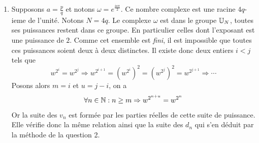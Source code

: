 \begin{enumerate}
\item Supposons $a=\frac{p}{q}$ et notons $\omega = e^{\frac{ia\pi}{2}}$. Ce nombre complexe est une racine $4q$-ieme de l'unité. Notons $N=4q$. Le complexe $\omega$ est dans le groupe $\mathbb{U}_N$, toutes ses puissances restent dans ce groupe. En particulier celles dont l'exposant est une puissance de $2$. Comme cet ensemble est \emph{fini}, il est impossible que toutes ces puissances soient deux à deux distinctes. Il existe donc deux entiers $i<j$ tels que
\begin{displaymath}
 w^{2^i} = w^{2^j} \Rightarrow w^{2^{i+1}}= \left( w^{2^i} \right)^2 = \left( w^{2^j}\right)^2  = w^{2^{j+1}} \Rightarrow \cdots
\end{displaymath}
Posons alors $m = i$ et $u=j-i$, on a
\begin{displaymath}
 \forall n\in \mathbb{N} : n\geq m \Rightarrow w^{2^{n+u}} = w^{2^n} 
\end{displaymath}
 Or la suite des $v_n$ est formée par les parties réelles de cette suite de puissance. Elle vérifie donc la même relation ainsi que la suite des $d_n$ qui s'en déduit par la méthode de la question 2.
\end{enumerate}
